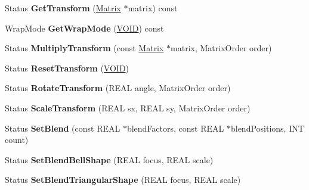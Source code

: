 \begin{DoxyCompactItemize}
\item 
\mbox{\label{class_linear_gradient_brush_ad1be1e0f18b335abca7fbb291386177d}} 
Status {\bfseries Get\+Transform} (\hyperlink{class_matrix}{Matrix} $\ast$matrix) const
\item 
\mbox{\label{class_linear_gradient_brush_aea5b1837ea01cca24e9da30890c8dfb8}} 
Wrap\+Mode {\bfseries Get\+Wrap\+Mode} (\hyperlink{interfacevoid}{V\+O\+ID}) const
\item 
\mbox{\label{class_linear_gradient_brush_aace5cdca54889a6a470981d343b8bf8d}} 
Status {\bfseries Multiply\+Transform} (const \hyperlink{class_matrix}{Matrix} $\ast$matrix, Matrix\+Order order)
\item 
\mbox{\label{class_linear_gradient_brush_a476e16b07bbbc6c3c3bcca579e76dac0}} 
Status {\bfseries Reset\+Transform} (\hyperlink{interfacevoid}{V\+O\+ID})
\item 
\mbox{\label{class_linear_gradient_brush_a727e402aa514adf62ea0ea3343d069df}} 
Status {\bfseries Rotate\+Transform} (R\+E\+AL angle, Matrix\+Order order)
\item 
\mbox{\label{class_linear_gradient_brush_aa58f75e5d7430bb7cefeb4a7b04b67b0}} 
Status {\bfseries Scale\+Transform} (R\+E\+AL sx, R\+E\+AL sy, Matrix\+Order order)
\item 
\mbox{\label{class_linear_gradient_brush_a8a75eb315f53e3098c4bb5ea6ce0c596}} 
Status {\bfseries Set\+Blend} (const R\+E\+AL $\ast$blend\+Factors, const R\+E\+AL $\ast$blend\+Positions, I\+NT count)
\item 
\mbox{\label{class_linear_gradient_brush_a58dd21c4147d06a51ed8dc0d7f8f80be}} 
Status {\bfseries Set\+Blend\+Bell\+Shape} (R\+E\+AL focus, R\+E\+AL scale)
\item 
\mbox{\label{class_linear_gradient_brush_a8e61bccd5fa435873cc92d54e097be0a}} 
Status {\bfseries Set\+Blend\+Triangular\+Shape} (R\+E\+AL focus, R\+E\+AL scale)
\item 

\end{DoxyCompactItemize}
